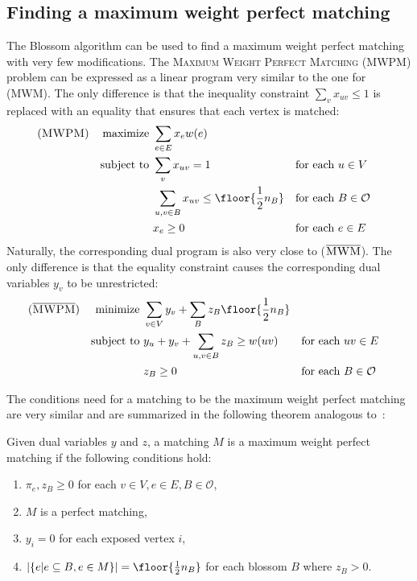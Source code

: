 \subsection{Finding a maximum weight perfect matching}

The Blossom algorithm can be used to find a maximum weight perfect matching with very few modifications. The \textsc{Maximum Weight Perfect Matching} \textsc{(MWPM)} problem can be expressed as a linear program very similar to the one for \textsc{(MWM)}. The only difference is that the inequality constraint $\sum_v x_{uv} \leq 1$ is replaced with an equality that ensures that each vertex is matched:
\begin{align*}
(\textsc{MWPM})
&& \text{maximize }   & \sum_{e \in E} x_e w(e)\\
&& \text{subject to } & \sum_v x_{uv} = 1                                    && \text{for each $u \in V$} \\
&&                    & \sum_{u, v \in B} x_{uv} \leq \floor{\frac{1}{2}n_B} && \text{for each $B \in \mathcal{O}$} \\
&&                    & x_e \geq 0                                           && \text{for each $e \in E$}
\end{align*}
Naturally, the corresponding dual program is also very close to ($\overline{\textsc{MWM}}$). The only difference is that the equality constraint causes the corresponding dual variables $y_v$ to be unrestricted:
\begin{align*}
(\overline{\textsc{MWPM}})
&& \text{minimize }   & \sum_{v\in V}y_v + \sum_{B} z_B \floor{\frac{1}{2}n_B} \\
&& \text{subject to } & y_u + y_v + \sum_{u, v \in B} z_B \geq w(uv) && \text{for each $uv \in E$} \\
&&                    & z_B \geq 0                                   && \text{for each $B \in \mathcal{O}$}
\end{align*}

The conditions need for a matching to be the maximum weight perfect matching are very similar and are summarized in the following theorem analogous to~:

\begin{theorem}\label{thm:conditions_perfect}
    Given dual variables $y$ and $z$, a matching $M$ is a maximum weight perfect matching if the following conditions hold:
    
    \begin{enumerate}
        \item $\pi_{e}, z_B \geq 0$ for each $v \in V, e \in E, B \in \mathcal{O}$,
        \item $M$ is a perfect matching,
        \item $y_i = 0$ for each exposed vertex $i$,
        \item $|\{e | e \subseteq B, e \in M\}| = \floor{\frac{1}{2}n_B}$ for each blossom $B$ where $z_B > 0$.
    \end{enumerate}
\end{theorem}

